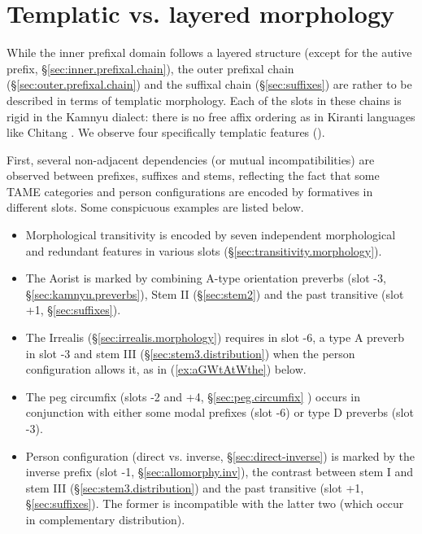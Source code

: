  

 \section{Templatic vs. layered morphology} \label{sec:templatic.verb}
While the inner prefixal domain follows a layered structure (except for the autive prefix, §\ref{sec:inner.prefixal.chain}), the outer prefixal chain (§\ref{sec:outer.prefixal.chain}) and the suffixal chain (§\ref{sec:suffixes}) are rather to be described in terms of templatic morphology. Each of the slots in these chains is rigid in the Kamnyu dialect: there is no free affix ordering as in Kiranti languages like Chitang \citep{bickel07chintang}. We observe four specifically templatic features (\citealt[216--218]{bickel07inflectional}). 

First, several non-adjacent dependencies (or mutual incompatibilities) are observed between prefixes, suffixes and stems, reflecting the fact that some TAME categories and person configurations are encoded by formatives in different slots. Some conspicuous examples are listed below.

\begin{itemize}
\item Morphological transitivity is encoded by seven independent morphological and redundant features in various slots (§\ref{sec:transitivity.morphology}).
\item The Aorist is marked by combining A-type orientation preverbs  (slot -3, §\ref{sec:kamnyu.preverbs}), Stem II (§\ref{sec:stem2}) and the past transitive  (slot +1, §\ref{sec:suffixes}).
\item  The Irrealis (§\ref{sec:irrealis.morphology}) requires  in slot -6, a type A preverb in slot -3 and stem III (§\ref{sec:stem3.distribution}) when the person configuration allows it, as in (\ref{ex:aGWtAtWthe}) below.
\item The peg circumfix  (slots -2 and +4, §\ref{sec:peg.circumfix} ) occurs in conjunction with either some modal prefixes (slot -6) or type D preverbs (slot -3).
\item   Person configuration (direct vs. inverse, §\ref{sec:direct-inverse}) is marked by the inverse prefix (slot -1, §\ref{sec:allomorphy.inv}), the contrast between stem I and stem III (§\ref{sec:stem3.distribution}) and the past transitive  (slot +1, §\ref{sec:suffixes}). The former is incompatible with the latter two (which occur in complementary distribution). 
\end{itemize}

